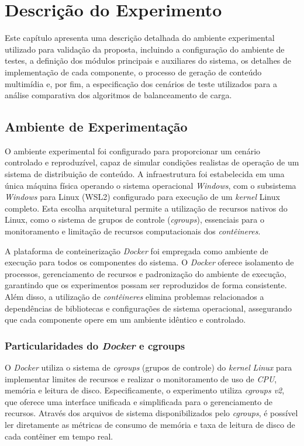 \chapter{Descrição do Experimento}

Este capítulo apresenta uma descrição detalhada do ambiente experimental utilizado para validação da proposta, incluindo a configuração do ambiente de testes, a definição dos módulos principais e auxiliares do sistema, os detalhes de implementação de cada componente, o processo de geração de conteúdo multimídia e, por fim, a especificação dos cenários de teste utilizados para a análise comparativa dos algoritmos de balanceamento de carga.

\section{Ambiente de Experimentação}

O ambiente experimental foi configurado para proporcionar um cenário controlado e reproduzível, capaz de simular condições realistas de operação de um sistema de distribuição de conteúdo. A infraestrutura foi estabelecida em uma única máquina física operando o sistema operacional \textit{Windows}, com o subsistema \textit{Windows} para Linux (WSL2) configurado para execução de um \textit{kernel} Linux completo. Esta escolha arquitetural permite a utilização de recursos nativos do Linux, como o sistema de grupos de controle (\textit{cgroups}), essenciais para o monitoramento e limitação de recursos computacionais dos \textit{contêineres}.

A plataforma de conteinerização \textit{Docker} foi empregada como ambiente de execução para todos os componentes do sistema. O \textit{Docker} oferece isolamento de processos, gerenciamento de recursos e padronização do ambiente de execução, garantindo que os experimentos possam ser reproduzidos de forma consistente. Além disso, a utilização de \textit{contêineres} elimina problemas relacionados a dependências de bibliotecas e configurações de sistema operacional, assegurando que cada componente opere em um ambiente idêntico e controlado.

\subsection{Particularidades do \textit{Docker} e cgroups}

O \textit{Docker} utiliza o sistema de \textit{cgroups} (grupos de controle) do \textit{kernel} \textit{Linux} para implementar limites de recursos e realizar o monitoramento de uso de \textit{CPU}, memória e leitura de disco. Especificamente, o experimento utiliza \textit{cgroups v2}, que oferece uma interface unificada e simplificada para o gerenciamento de recursos. Através dos arquivos de sistema disponibilizados pelo \textit{cgroups}, é possível ler diretamente as métricas de consumo de memória e taxa de leitura de disco de cada contêiner em tempo real.

